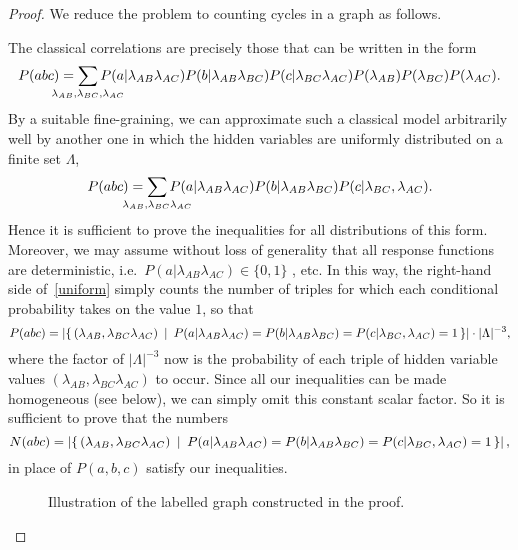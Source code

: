 \documentclass[aps,english,superscriptaddress,twocolumn,twoside,prl]{revtex4-1}%
\newcommand{\beq}{\begin{equation}}
\newcommand{\eeq}{\end{equation}}
\theoremstyle{plain}
\theoremstyle{definition}
\theoremstyle{remark}
\numberwithin{equation}{section}
\begin{document}
\begin{proof}
We reduce the problem to counting cycles in a graph as follows.

The classical correlations are precisely those that can be written in the form
\[
P(abc) = \sum_{\mathclap{\lambda_{AB},\lambda_{BC},\lambda_{AC}}} P(a|\lambda_{AB}\lambda_{AC}) P(b|\lambda_{AB}\lambda_{BC}) P(c|\lambda_{BC}\lambda_{AC}) P(\lambda_{AB}) P(\lambda_{BC}) P(\lambda_{AC}).
\]
By a suitable fine-graining, we can approximate such a classical model arbitrarily well by another one in which the hidden variables are uniformly distributed on a finite set $\Lambda$,
\beq
\label{uniform}
P(abc) = \sum_{\mathclap{\lambda_{AB},\lambda_{BC}\lambda_{AC}}} P(a|\lambda_{AB}\lambda_{AC}) P(b|\lambda_{AB}\lambda_{BC}) P(c|\lambda_{BC},\lambda_{AC}).
\eeq
Hence it is sufficient to prove the inequalities for all distributions of this form. Moreover, we may assume without loss of generality that all response functions are deterministic, i.e.~$P(a|\lambda_{AB}\lambda_{AC})\in\{0,1\}$
, etc. In this way, the right-hand side of~\eqref{uniform} simply counts the number of triples for which each conditional probability takes on the value $1$, so that
\[
P(abc) = \left|\set{ (\lambda_{AB},\lambda_{BC}\lambda_{AC}) \: |\: P(a|\lambda_{AB}\lambda_{AC}) = P(b|\lambda_{AB}\lambda_{BC}) = P(c|\lambda_{BC},\lambda_{AC}) = 1 } \right|\cdot |\Lambda|^{-3},
\]
where the factor of $|\Lambda|^{-3}$ now is the probability of each triple of hidden variable values $(\lambda_{AB},\lambda_{BC}\lambda_{AC})$ to occur. Since all our inequalities can be made homogeneous (see below), we can simply omit this constant scalar factor. So it is sufficient to prove that the numbers
\beq
\label{cyclecounter}
N(abc) = \left|\set{ (\lambda_{AB},\lambda_{BC}\lambda_{AC}) \: |\: P(a|\lambda_{AB}\lambda_{AC}) = P(b|\lambda_{AB}\lambda_{BC}) = P(c|\lambda_{BC},\lambda_{AC}) = 1 } \right|%
,
\eeq
in place of $P(a,b,c)$ satisfy our inequalities.

\begin{figure}
\centering
{}
\caption{Illustration of the labelled graph constructed in the proof.}
\label{fig:graph}
\end{figure}


\end{proof}
\end{document}

